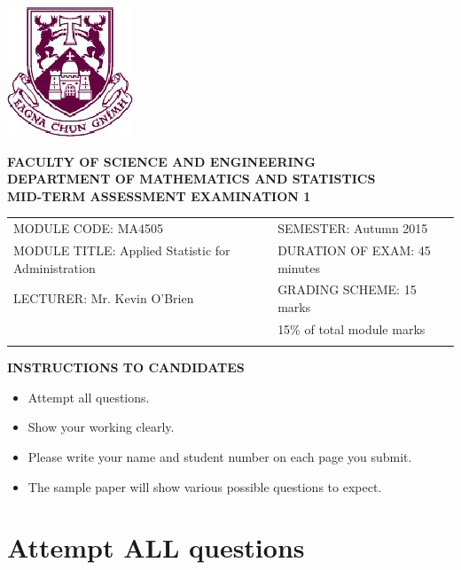 \documentclass[a4paper,12pt]{article}
\begin{document}
\begin{center}
	\includegraphics[scale=0.60]{images/shieldtransparent2}
\end{center}

\begin{center}
	\vspace{1cm}
	\large \bf {FACULTY OF SCIENCE AND ENGINEERING} \\[0.5cm]
	\normalsize DEPARTMENT OF MATHEMATICS AND STATISTICS \\[1.25cm]
	\large \bf {MID-TERM ASSESSMENT EXAMINATION 1} \\[1.5cm]
\end{center}

\begin{tabular}{ll}
	MODULE CODE: MA4505 & SEMESTER: Autumn 2015\\[1cm]
	MODULE TITLE: Applied Statistic for Administration  & DURATION OF EXAM: 45 minutes \\[1cm]
	LECTURER: Mr. Kevin O'Brien & GRADING SCHEME: 15 marks \\
	& \phantom{GRADING SCHEME:} \footnotesize {15\% of total module marks} \\[0.2cm]
	\\[1cm]
\end{tabular}
\begin{center}
	{\bf INSTRUCTIONS TO CANDIDATES}
\end{center}
\begin{itemize}
	\item Attempt all questions.
	\item Show your working clearly.
	\item Please write your name and student number on each page you submit.
	\item The sample paper will show various possible questions to expect.
\end{itemize}
\newpage
\section*{Attempt ALL questions}

\bigskip
\end{document}
